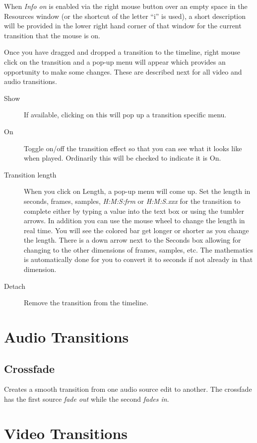 When \textit{Info on} is enabled via the right mouse button over an empty space in the Resources window (or the shortcut of the letter “i” is used), a short description will be provided in the lower right hand corner of that window for the current transition that the mouse is on.

Once you have dragged and dropped a transition to the timeline, right mouse click on the transition and a pop-up menu will appear which provides an opportunity to make some changes.  These are described next for all video and audio transitions. 

\begin{description}
    \item[Show] If available, clicking on this will pop up a transition specific menu.
    \item[On] Toggle on/off the transition effect so that you can see what it looks like when played. Ordinarily this will be checked to indicate it is On.
    \item[Transition length] When you click on Length, a pop-up menu will come up.  Set the length in seconds, frames, samples, \textit{H:M:S:frm} or \textit{H:M:S.xxx} for the transition to complete either by typing a value into the text box or using the tumbler arrows.  In addition you can use the mouse wheel to change the length in real time. You will see the colored bar get longer or shorter as you change the length. 
There is a down arrow next to the Seconds box allowing for changing to the other dimensions of frames, samples, etc.  The mathematics is automatically done for you to convert it to seconds if not already in that dimension.
    \item[Detach] Remove the transition from the timeline.
\end{description}

\section{Audio Transitions}%
\label{sec:audio_transition}

\subsection*{Crossfade}%
\label{sub:crossfade}

Creates a smooth transition from one audio source edit to another. The crossfade has the first source \textit{fade out} while the second \textit{fades in}.

\section{Video Transitions}%
\label{sec:video_transition}

